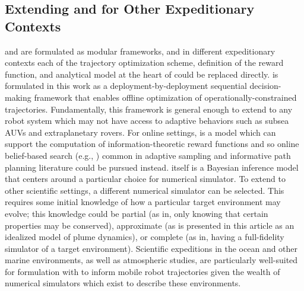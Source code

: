 \subsection{Extending \PHORTEX and \PHUMES for Other Expeditionary Contexts}
\PHORTEX and \PHUMES are formulated as modular frameworks, and in different expeditionary contexts each of the trajectory optimization scheme, definition of the reward function, and analytical model at the heart of \PHUMES could be replaced directly. \PHORTEX is formulated in this work as a deployment-by-deployment sequential decision-making framework that enables offline optimization of operationally-constrained trajectories. Fundamentally, this framework is general enough to extend to any robot system which may not have access to adaptive behaviors such as subsea AUVs and extraplanetary rovers. For online settings, \PHUMES is a model which can support the computation of information-theoretic reward functions and so online belief-based search (e.g., \cite{flaspohler2019information, Arora2017, Sun2017, sunberg2018online}) common in adaptive sampling and informative path planning literature could be pursued instead. \PHUMES itself is a Bayesian inference model that centers around a particular choice for numerical simulator. To extend to other scientific settings, a different numerical simulator can be selected. This requires some initial knowledge of how a particular target environment may evolve; this knowledge could be partial (as in, only knowing that certain properties may be conserved), approximate (as is presented in this article as an idealized model of plume dynamics), or complete (as in, having a full-fidelity simulator of a target environment). Scientific expeditions in the ocean and other marine environments, as well as atmospheric studies, are particularly well-suited for formulation with \PHUMES to inform mobile robot trajectories given the wealth of numerical simulators which exist to describe these environments. 


